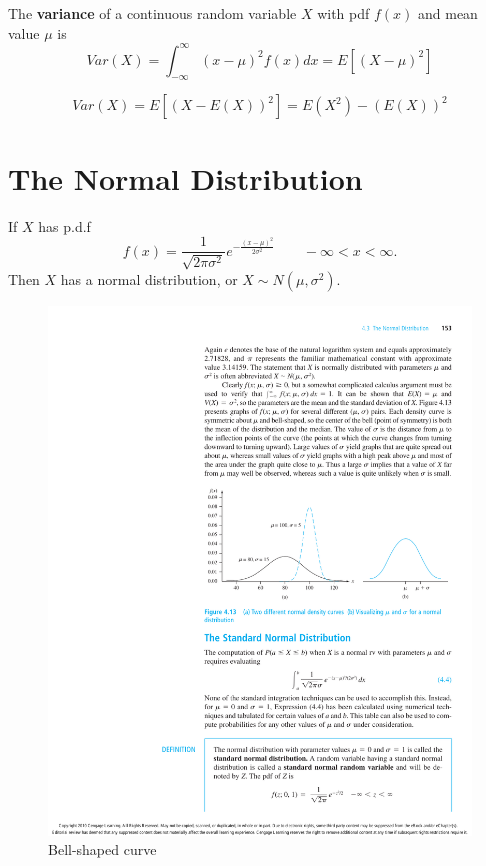 \begin{defn}
The \textbf{variance} of a continuous random variable $X$ with pdf $f(x)$ and mean value $\mu$ is
\[Var(X)=\int_{-\infty}^{\infty} (x-\mu)^2f(x)dx=E[(X-\mu)^2]\]
\end{defn}

\begin{prop}
\[Var(X)=E[(X-E(X))^2]=E(X^2)-(E(X))^2\]
\end{prop}

\section{The Normal Distribution}
If $X$ has p.d.f 
\[f(x)=\frac{1}{\sqrt{2 \pi \sigma^2}} e^{-\frac{(x-\mu)^2}{2 \sigma^2}}   \qquad -\infty< x< \infty. \]
Then $X$ has a normal distribution, or $X \sim N(\mu,\sigma^2)$.

\begin{figure}[H]
\centering
\includegraphics{figures/normal_distribution.pdf}
\caption{Bell-shaped curve}
\end{figure}

